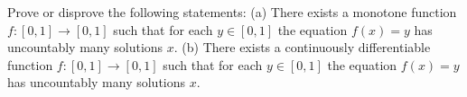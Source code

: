 Prove or disprove the following statements:
(a) There exists a monotone function $f : [0, 1] \rightarrow [0, 1]$ such that for each $y \in [0, 1]$ the equation $f(x) = y$ has uncountably many solutions $x$.
(b) There exists a continuously differentiable function $f : [0, 1] \rightarrow [0, 1]$ such that for each $y \in [0, 1]$ the equation $f(x) = y$ has uncountably many solutions $x$.